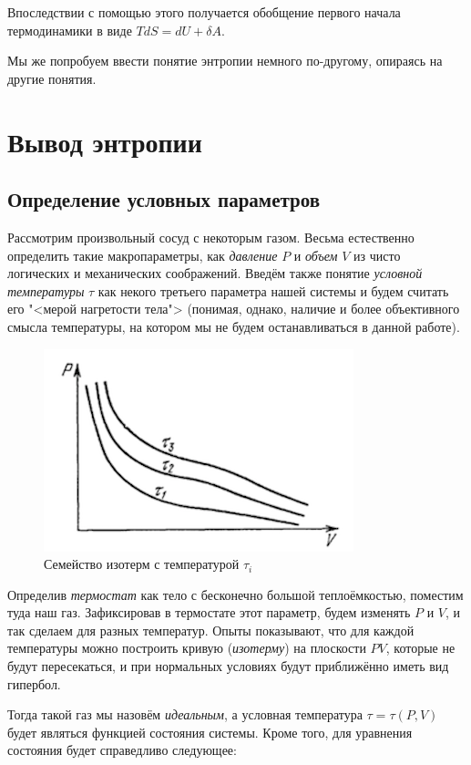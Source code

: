 \documentclass[12pt]{kiarticle}
\newcommand{\del}{\ensuremath{\delta}}
\begin{document}
Впоследствии с помощью этого получается обобщение первого начала термодинамики в виде $ TdS = dU + \del A $. 

Мы же попробуем ввести понятие энтропии немного по-другому, опираясь на другие понятия.

\section{Вывод энтропии}

\subsection{Определение условных параметров} \label{ifTS}

Рассмотрим произвольный сосуд с некоторым газом. Весьма естественно определить такие макропараметры, как \textit{давление} $ P $ и \textit{объем} $ V $ из чисто логических и механических соображений. Введём также понятие \textit{условной температуры} $ \tau $ как некого третьего параметра нашей системы и будем считать его "<мерой нагретости тела"> (понимая, однако, наличие и более объективного смысла температуры, на котором мы не будем останавливаться в данной работе). 

\begin{figure} 
	\includegraphics{tempdef}
	\caption{Семейство изотерм с температурой $ \tau_i $}
\end{figure}

Определив \textit{термостат} как тело с бесконечно большой теплоёмкостью, поместим туда наш газ. Зафиксировав в термостате этот параметр, будем изменять $ P $ и $ V $, и так сделаем для разных температур. Опыты показывают, что для каждой температуры можно построить кривую (\textit{изотерму}) на плоскости $ PV $, которые не будут пересекаться, и при нормальных условиях будут приближённо иметь вид гипербол. 

Тогда такой газ мы назовём \textit{идеальным}, а условная температура $ \tau = \tau (P, V) $ будет являться функцией состояния системы. Кроме того, для уравнения состояния будет справедливо следующее:
\end{document}
